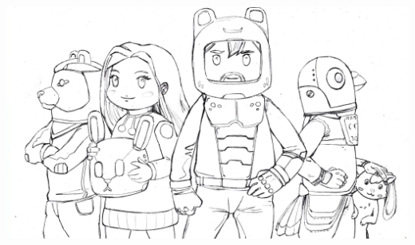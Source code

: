 \documentclass{article}
\newcommand{\bckg}[1]{\AddToShipoutPictureBG*{\texttt{[image: \#1]}}}
\begin{document}
\phantom{;}


\clearpage













\bckg{Assets/diejager_space_extrasmaller/diejager_space_bw}

\vspace*{\fill}
\includegraphics[width=.7\paperwidth]{Assets/cosmoose_cover_drawz}
\end{document}
